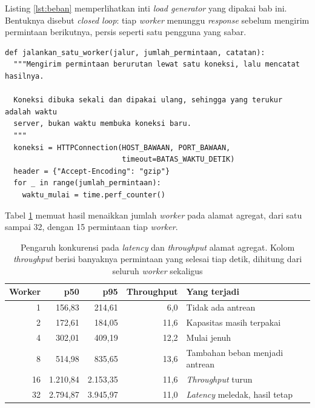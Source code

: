 Listing \ref{lst:beban} memperlihatkan inti \textit{load generator} yang
dipakai bab ini. Bentuknya disebut \textit{closed loop}: tiap \textit{worker}
menunggu \textit{response} sebelum mengirim permintaan berikutnya, persis seperti satu
pengguna yang sabar.

\begin{lstlisting}[style=PythonStyle, caption={Satu worker mengirim permintaan berurutan lewat koneksi yang dipakai ulang, tersedia di \berkas{sources/chapter05/beban.py}}, label={lst:beban}]
def jalankan_satu_worker(jalur, jumlah_permintaan, catatan):
  """Mengirim permintaan berurutan lewat satu koneksi, lalu mencatat hasilnya.

  Koneksi dibuka sekali dan dipakai ulang, sehingga yang terukur adalah waktu
  server, bukan waktu membuka koneksi baru.
  """
  koneksi = HTTPConnection(HOST_BAWAAN, PORT_BAWAAN,
                           timeout=BATAS_WAKTU_DETIK)
  header = {"Accept-Encoding": "gzip"}
  for _ in range(jumlah_permintaan):
    waktu_mulai = time.perf_counter()
\end{lstlisting}

Tabel \ref{tab:ramp} memuat hasil menaikkan jumlah \textit{worker} pada alamat
agregat, dari satu sampai 32, dengan 15 permintaan tiap \textit{worker}.

\begin{table}[!htb]
  \centering
  \caption{Pengaruh konkurensi pada \textit{latency} dan \textit{throughput}
           alamat agregat. Kolom \textit{throughput} berisi banyaknya
           permintaan yang selesai tiap detik, dihitung dari seluruh
           \textit{worker} sekaligus}
  \label{tab:ramp}
  \begin{tabularx}{\textwidth}{rrrrX}
    \hline
    \textbf{Worker} & \textbf{p50} & \textbf{p95} & \textbf{Throughput} & \textbf{Yang terjadi} \\
    \hline
    1 & 156,83 & 214,61 & 6,0 & Tidak ada antrean \\
    \hline
    2 & 172,61 & 184,05 & 11,6 & Kapasitas masih terpakai \\
    \hline
    4 & 302,01 & 409,19 & 12,2 & Mulai jenuh \\
    \hline
    8 & 514,98 & 835,65 & 13,6 & Tambahan beban menjadi antrean \\
    \hline
    16 & 1.210,84 & 2.153,35 & 11,6 & \textit{Throughput} turun \\
    \hline
    32 & 2.794,87 & 3.945,97 & 11,0 & \textit{Latency} meledak, hasil tetap \\
    \hline
  \end{tabularx}
\end{table}

